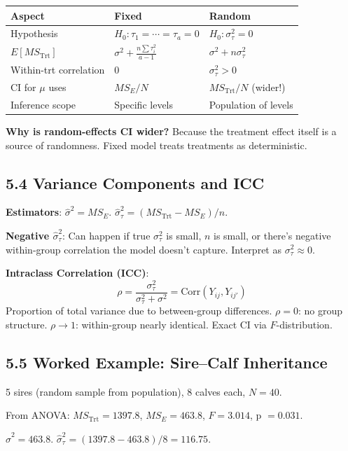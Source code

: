 \documentclass[9pt,letterpaper]{article}
\begin{document}
\begin{center}\small
\begin{tabular}{@{}p{3cm}ll@{}}
\toprule
\textbf{Aspect} & \textbf{Fixed} & \textbf{Random} \\
\midrule
Hypothesis & $H_0:\tau_1=\cdots=\tau_a=0$ & $H_0:\sigma_\tau^2=0$ \\
$E[MS_{\text{Trt}}]$ & $\sigma^2+\frac{n\sum\tau_i^2}{a-1}$ & $\sigma^2+n\sigma_\tau^2$ \\
Within-trt correlation & 0 & $\sigma_\tau^2 > 0$ \\
CI for $\mu$ uses & $MS_E/N$ & $MS_{\text{Trt}}/N$ (wider!) \\
Inference scope & Specific levels & Population of levels \\
\bottomrule
\end{tabular}
\end{center}

\textbf{Why is random-effects CI wider?} Because the treatment effect itself is a source of randomness. Fixed model treats treatments as deterministic.

\subsection{5.4 Variance Components and ICC}

\textbf{Estimators}: $\hat\sigma^2 = MS_E$. \quad $\hat\sigma_\tau^2 = (MS_{\text{Trt}} - MS_E)/n$.

\textbf{Negative $\hat\sigma_\tau^2$}: Can happen if true $\sigma_\tau^2$ is small, $n$ is small, or there's negative within-group correlation the model doesn't capture. Interpret as $\sigma_\tau^2 \approx 0$.

\textbf{Intraclass Correlation (ICC)}:
\[
\rho = \frac{\sigma_\tau^2}{\sigma_\tau^2 + \sigma^2} = \text{Corr}(Y_{ij}, Y_{ij'})
\]
Proportion of total variance due to between-group differences. $\rho=0$: no group structure. $\rho \to 1$: within-group nearly identical. Exact CI via $F$-distribution.

\subsection{5.5 Worked Example: Sire--Calf Inheritance}

5 sires (random sample from population), 8 calves each, $N=40$.

From ANOVA: $MS_{\text{Trt}}=1397.8$, $MS_E=463.8$, $F=3.014$, p $=0.031$.

$\hat\sigma^2 = 463.8$. \quad $\hat\sigma_\tau^2 = (1397.8-463.8)/8 = 116.75$.
\end{document}
